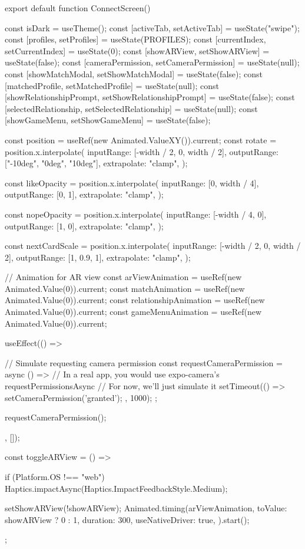 export default function ConnectScreen() {
  const { isDark } = useTheme();
  const [activeTab, setActiveTab] = useState("swipe");
  const [profiles, setProfiles] = useState(PROFILES);
  const [currentIndex, setCurrentIndex] = useState(0);
  const [showARView, setShowARView] = useState(false);
  const [cameraPermission, setCameraPermission] = useState(null);
  const [showMatchModal, setShowMatchModal] = useState(false);
  const [matchedProfile, setMatchedProfile] = useState(null);
  const [showRelationshipPrompt, setShowRelationshipPrompt] = useState(false);
  const [selectedRelationship, setSelectedRelationship] = useState(null);
  const [showGameMenu, setShowGameMenu] = useState(false);
  
  const position = useRef(new Animated.ValueXY()).current;
  const rotate = position.x.interpolate({
    inputRange: [-width / 2, 0, width / 2],
    outputRange: ["-10deg", "0deg", "10deg"],
    extrapolate: "clamp",
  });
  
  const likeOpacity = position.x.interpolate({
    inputRange: [0, width / 4],
    outputRange: [0, 1],
    extrapolate: "clamp",
  });
  
  const nopeOpacity = position.x.interpolate({
    inputRange: [-width / 4, 0],
    outputRange: [1, 0],
    extrapolate: "clamp",
  });
  
  const nextCardScale = position.x.interpolate({
    inputRange: [-width / 2, 0, width / 2],
    outputRange: [1, 0.9, 1],
    extrapolate: "clamp",
  });

  // Animation for AR view
  const arViewAnimation = useRef(new Animated.Value(0)).current;
  const matchAnimation = useRef(new Animated.Value(0)).current;
  const relationshipAnimation = useRef(new Animated.Value(0)).current;
  const gameMenuAnimation = useRef(new Animated.Value(0)).current;
  
  useEffect(() => {
    // Simulate requesting camera permission
    const requestCameraPermission = async () => {
      // In a real app, you would use expo-camera's requestPermissionsAsync
      // For now, we'll just simulate it
      setTimeout(() => {
        setCameraPermission('granted');
      }, 1000);
    };
    
    requestCameraPermission();
  }, []);

  const toggleARView = () => {
    if (Platform.OS !== "web") {
      Haptics.impactAsync(Haptics.ImpactFeedbackStyle.Medium);
    }
    
    setShowARView(!showARView);
    Animated.timing(arViewAnimation, {
      toValue: showARView ? 0 : 1,
      duration: 300,
      useNativeDriver: true,
    }).start();
  };
  
}

